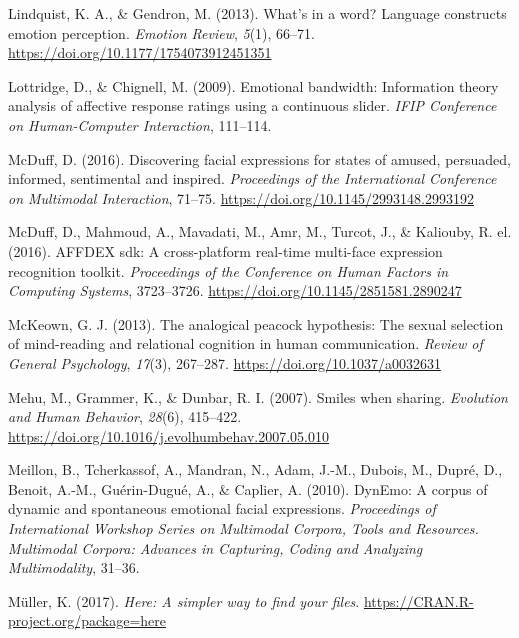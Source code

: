 \documentclass[
  english,
  man]{apa7}
\newlength{\cslhangindent}
\newenvironment{cslreferences}%
  {\setlength{\parindent}{0pt}%
  \everypar{\setlength{\hangindent}{\cslhangindent}}\ignorespaces}%
  {\par}
\begin{document}
\begin{cslreferences}
\leavevmode\hypertarget{ref-lindquist2013s}{}%
Lindquist, K. A., \& Gendron, M. (2013). What's in a word? Language constructs emotion perception. \emph{Emotion Review}, \emph{5}(1), 66--71. \url{https://doi.org/10.1177/1754073912451351}

\leavevmode\hypertarget{ref-lottridge2009emotional}{}%
Lottridge, D., \& Chignell, M. (2009). Emotional bandwidth: Information theory analysis of affective response ratings using a continuous slider. \emph{IFIP Conference on Human-Computer Interaction}, 111--114.

\leavevmode\hypertarget{ref-mcduff2016discovering}{}%
McDuff, D. (2016). Discovering facial expressions for states of amused, persuaded, informed, sentimental and inspired. \emph{Proceedings of the International Conference on Multimodal Interaction}, 71--75. \url{https://doi.org/10.1145/2993148.2993192}

\leavevmode\hypertarget{ref-mcduff2016affdex}{}%
McDuff, D., Mahmoud, A., Mavadati, M., Amr, M., Turcot, J., \& Kaliouby, R. el. (2016). AFFDEX sdk: A cross-platform real-time multi-face expression recognition toolkit. \emph{Proceedings of the Conference on Human Factors in Computing Systems}, 3723--3726. \url{https://doi.org/10.1145/2851581.2890247}

\leavevmode\hypertarget{ref-mckeown2013analogical}{}%
McKeown, G. J. (2013). The analogical peacock hypothesis: The sexual selection of mind-reading and relational cognition in human communication. \emph{Review of General Psychology}, \emph{17}(3), 267--287. \url{https://doi.org/10.1037/a0032631}

\leavevmode\hypertarget{ref-mehu2007smiles}{}%
Mehu, M., Grammer, K., \& Dunbar, R. I. (2007). Smiles when sharing. \emph{Evolution and Human Behavior}, \emph{28}(6), 415--422. \url{https://doi.org/10.1016/j.evolhumbehav.2007.05.010}

\leavevmode\hypertarget{ref-meillon2010dynemo}{}%
Meillon, B., Tcherkassof, A., Mandran, N., Adam, J.-M., Dubois, M., Dupré, D., Benoit, A.-M., Guérin-Dugué, A., \& Caplier, A. (2010). DynEmo: A corpus of dynamic and spontaneous emotional facial expressions. \emph{Proceedings of International Workshop Series on Multimodal Corpora, Tools and Resources. Multimodal Corpora: Advances in Capturing, Coding and Analyzing Multimodality}, 31--36.

\leavevmode\hypertarget{ref-R-here}{}%
Müller, K. (2017). \emph{Here: A simpler way to find your files}. \url{https://CRAN.R-project.org/package=here}


\end{cslreferences}
\end{document}
